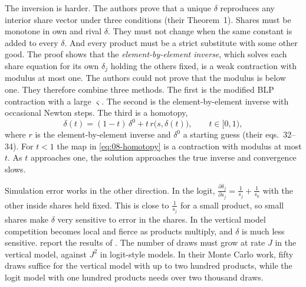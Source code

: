 The inversion is harder. The authors prove that a unique $\delta$ reproduces any interior share vector under three
conditions (their Theorem~1). Shares must be monotone in own and rival $\delta$. They must not change when the same
constant is added to every $\delta$. And every product must be a strict substitute with some other good. The proof shows that the
\emph{element-by-element inverse}, which solves each share equation for its own $\delta_j$ holding the others fixed, is a
weak contraction with modulus at most one. The authors could not prove that the modulus is below one. They therefore
combine three methods. The first is the modified BLP contraction with a large $\varsigma$. The second is the
element-by-element inverse with occasional Newton steps. The third is a homotopy,
\begin{equation}\label{eq:08-homotopy}
  \delta(t) = (1 - t)\,\delta^0 + t\, r\big(s, \delta(t)\big), \qquad t \in [0, 1),
\end{equation}
where $r$ is the element-by-element inverse and $\delta^0$ a starting guess (their eqs.~32--34). For $t < 1$ the map in
\eqref{eq:08-homotopy} is a contraction with modulus at most $t$. As $t$ approaches one, the solution approaches the true
inverse and convergence slows.

Simulation error works in the other direction. In the logit, $\frac{\partial\delta_j}{\partial s_j} = \frac{1}{s_j} +
\frac{1}{s_0}$ with the other inside shares held fixed. This is close to $\frac{1}{s_j}$ for a small product, so
small shares make $\delta$ very sensitive to error in the shares. In the vertical model competition becomes local and
fierce as products multiply, and $\delta$ is much less sensitive. \citet[Section~4.4]{BerryPakes2007} report the
results of \citet{BerryLintonPakes2004}. The number of draws must grow at rate $J$ in the vertical model, against $J^2$
in logit-style models. In their Monte Carlo work, fifty draws suffice for the vertical model with up to two hundred
products, while the logit model with one hundred products needs over two thousand draws.

